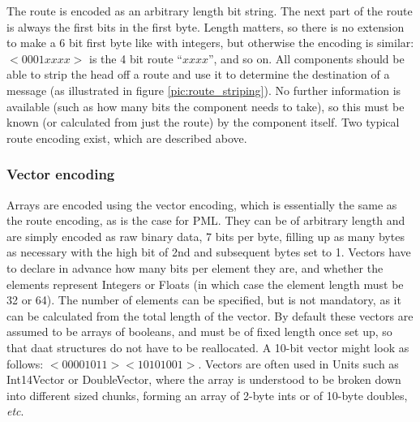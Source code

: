\documentclass[pdftex,a4paper]{article}
\newif\ifpdf
\newcommand{\et}{{\it etc}}
\begin{document}
\ifpdf
\begin{figure}[htb]
  \begin{center}
    \texttt{[image: route\_striping.pdf]}
    \caption{Illustration of route stripping as a message is sent from
    one component to another (in this example from the GUI to the
    robot). In general a message may travel through any number of
    intermediate components before it reaches its destination (as
    determined by the route a message must take). Each component
    receives the message and determines whether it should be further
    routed or consumed. It makes this decision by examining the
    message's route bit string. If the route is not empty then its
    leading bits are used to identify an outbound port, and the message
    is sent through that port after removing the relevant leading bits
    from the route string : hence at each ``hop'' the route string is
    altered.  If a component receives a message containing an empty
    route string then it is consumed : it is dispatched for internal
    processing as appropriate to the type and content of the message.}
    \label{pic:route_striping}
  \end{center}
\end{figure}
\fi

The route is encoded as an arbitrary length bit string. The next part
of the route is always the first bits in the first byte. Length
matters, so there is no extension to make a 6 bit first byte like with
integers, but otherwise the encoding is similar: $<0001xxxx>$ is the 4
bit route ``$xxxx$'', and so on. All components should be able to
strip the head off a route and use it to determine the destination of
a message (as illustrated in figure \ref{pic:route_striping}). No
further information is available (such as how many bits the component
needs to take), so this must be known (or calculated from just the
route) by the component itself. Two typical route encoding exist,
which are described above.

\subsubsection{Vector encoding}

Arrays are encoded using the vector encoding, which is essentially the
same as the route encoding, as is the case for PML. They can be of
arbitrary length and are simply encoded as raw binary data, 7 bits per
byte, filling up as many bytes as necessary with the high bit of 2nd
and subsequent bytes set to 1. Vectors have to declare in advance how
many bits per element they are, and whether the elements represent
Integers or Floats (in which case the element length must be 32 or
64). The number of elements can be specified, but is not mandatory, as
it can be calculated from the total length of the vector. By default
these vectors are assumed to be arrays of booleans, and must be of
fixed length once set up, so that daat structures do not have to be
reallocated. A 10-bit vector might look as follows: $<00001011>
<10101001>$. Vectors are often used in Units such as Int14Vector or
DoubleVector, where the array is understood to be broken down into
different sized chunks, forming an array of 2-byte ints or of 10-byte
doubles, \et.
\end{document}
